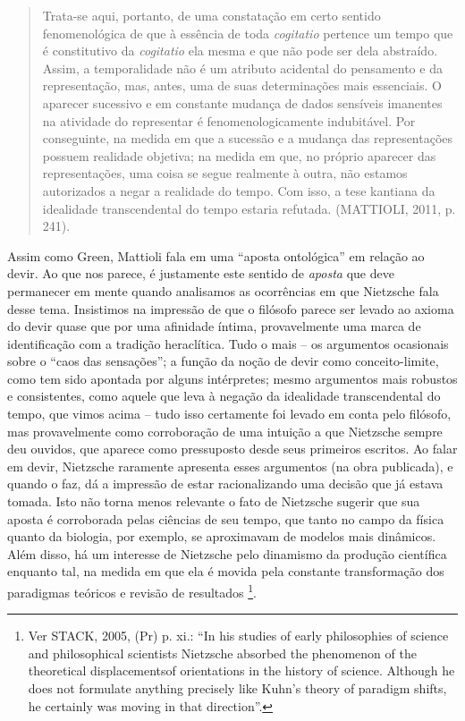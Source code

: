 \documentclass[
	12pt,				%
	openright,			%
	oneside,			%
	a4paper,			%
	english,			%
	french,				%
	spanish,			%
	brazil				%
	]{abntex2}
\begin{document}
\begin{quotation}
Trata-se aqui, portanto, de uma constatação em certo sentido fenomenológica de que à essência de toda \textit{cogitatio} pertence um tempo que é constitutivo da \textit{cogitatio} ela mesma e que não pode ser dela abstraído. Assim, a temporalidade não é um atributo acidental do pensamento e da representação, mas, antes, uma de suas determinações mais essenciais. O aparecer sucessivo e em constante mudança de dados sensíveis imanentes na atividade do representar é fenomenologicamente indubitável. Por conseguinte, na medida em que a sucessão e a mudança das representações possuem realidade objetiva; na medida em que, no próprio aparecer das representações, uma coisa se segue realmente à outra, não estamos autorizados a negar a realidade do tempo. Com isso, a tese kantiana da idealidade transcendental do tempo estaria refutada. (MATTIOLI, 2011, p. 241).
\end{quotation}

Assim como Green, Mattioli fala em uma “aposta ontológica” em relação ao devir. Ao que nos parece, é justamente este sentido de \textit{aposta} que deve permanecer em mente quando analisamos as ocorrências em que Nietzsche fala desse tema. Insistimos na impressão de que o filósofo parece ser levado ao axioma do devir quase que por uma afinidade íntima, provavelmente uma marca de identificação com a tradição heraclítica. Tudo o mais – os argumentos ocasionais sobre o “caos das sensações”; a função da noção de devir como conceito-limite, como tem sido apontada por alguns intérpretes; mesmo argumentos mais robustos e consistentes, como aquele que leva à negação da idealidade transcendental do tempo, que vimos acima – tudo isso certamente foi levado em conta pelo filósofo, mas provavelmente como corroboração de uma intuição a que Nietzsche sempre deu ouvidos, que aparece como pressuposto desde seus primeiros escritos. Ao falar em devir, Nietzsche raramente apresenta esses argumentos (na obra publicada), e quando o faz, dá a impressão de estar racionalizando uma decisão que já estava tomada. Isto não torna menos relevante o fato de  Nietzsche sugerir que sua aposta é corroborada pelas ciências de seu tempo, que tanto no campo da física quanto da biologia, por exemplo, se aproximavam de modelos mais dinâmicos. Além disso, há um interesse de Nietzsche pelo dinamismo da produção científica enquanto tal, na medida em que ela é movida pela constante transformação dos paradigmas teóricos e revisão de resultados
\footnote{Ver STACK, 2005, (Pr) p. xi.: “In his studies of early philosophies of science and philosophical scientists Nietzsche absorbed the phenomenon of the theoretical displacementsof orientations in the history of science. Although he does not formulate anything precisely like Kuhn’s theory of paradigm shifts, he certainly was moving in that direction”. }.
\end{document}
